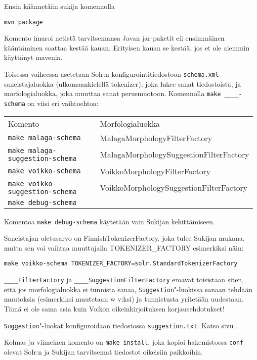 \documentclass[12pt,a4paper]{scrartcl}
\begin{document}
Ensin käännetään sukija komennolla

\verb=mvn package=

Komento imuroi netistä tarvitsemansa Javan jar-paketit eli ensimmäinen
kääntäminen saattaa kestää kauan. Erityisen kauan se kestää, jos et
ole aiemmin käyttänyt mavenia.

\bigskip Toisessa vaiheessa asetetaan Solr:n konfigurointitiedostoon
\verb=schema.xml= saneistajaluokka (ulkomaankielellä tokenizer), joka
lukee sanat tiedostoista, ja morfologialuokka, joka muuttaa sanat
perusmuotoon. Komennolla \verb|make ____-schema| on viisi eri
vaihtoehtoa:

\begin{tabular}{@{}ll}
Komento                              & Morfologialuokka \\
\verb=make malaga-schema=            & MalagaMorphologyFilterFactory \\
\verb=make malaga-suggestion-schema= & MalagaMorphologySuggestionFilterFactory \\
\verb=make voikko-schema=            & VoikkoMorphologyFilterFactory \\
\verb=make voikko-suggestion-schema= & VoikkoMorphologySuggestionFilterFactory \\
\verb=make debug-schema=             &
\end{tabular}

Komentoa \verb=make debug-schema= käytetään vain Sukijan
kehittämiseen.

Saneistajan oletusarvo on FinnishTokenizerFactory, joka tulee Sukijan
mukana, mutta sen voi vaihtaa muuttujalla TOKENIZER\_FACTORY
esimerkiksi näin:

\verb|make voikko-schema TOKENIZER_FACTORY=solr.StandardTokenizerFactory|

\verb=____FilterFactory= ja \verb=____SuggestionFilterFactory= eroavat
toisistaan siten, että jos morfologialuokka ei tunnista sanaa,
\verb=Suggestion="-luokissa sanaan tehdään muutoksia (esimerkiksi
muutetaan w v:ksi) ja tunnistusta yritetään uudestaan. Tämä ei ole
sama asia kuin Voikon oikeinkirjoituksen korjausehdotukset!

\verb=Suggestion="-luokat konfiguroidaan tiedostossa
\verb|suggestion.txt|. Katso sivu .



\bigskip
Kolmas ja viimeinen komento on \verb=make install=, joka kopioi
hakemistossa \verb=conf= olevat Solr:n ja Sukijan tarvitsemat
tiedostot oikeisiin paikkoihin.
\end{document}
